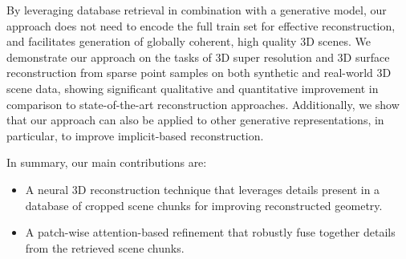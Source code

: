 By leveraging database retrieval in combination with a generative model, our approach does not need to encode the full train set for effective reconstruction, and facilitates generation of globally coherent, high quality 3D scenes.
We demonstrate our approach on the tasks of 3D super resolution and 3D surface reconstruction from sparse point samples on both synthetic and real-world 3D scene data, showing significant qualitative and quantitative improvement in comparison to state-of-the-art reconstruction approaches.
Additionally, we show that our approach can also be applied to other generative representations, in particular, to improve implicit-based reconstruction.

In summary, our main contributions are:
%
\begin{itemize}
    \item A neural 3D reconstruction technique that leverages details present in a database of cropped scene chunks for improving reconstructed geometry.
    \item A patch-wise attention-based refinement that robustly fuse together details from the retrieved scene chunks.
\end{itemize}
